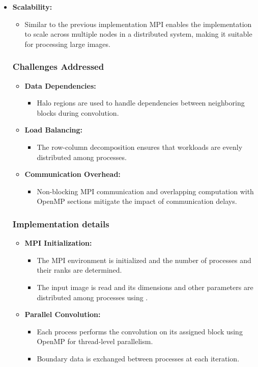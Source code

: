 \documentclass[conference, 10pt]{IEEEtran}
\begin{document}
\begin{itemize}
\begin{itemize}
    \item \textbf{Scalability:} 
    \begin{itemize}
    \item Similar to the previous implementation MPI enables the implementation to scale across multiple nodes in a distributed system, making it suitable for processing large images.
    \end{itemize}


\subsubsection{Challenges Addressed}
\begin{itemize}
 \item   \textbf{Data Dependencies:}
        \begin{itemize}
        \item Halo regions are used to handle dependencies between neighboring blocks during convolution.
        \end{itemize}

\item \textbf{Load Balancing:}
        \begin{itemize}
        \item The row-column decomposition ensures that workloads are evenly distributed among processes.
        \end{itemize}
\item \textbf{Communication Overhead:}
        \begin{itemize}
        \item Non-blocking MPI communication and overlapping computation with OpenMP sections mitigate the impact of communication delays.
        \end{itemize}

\end{itemize}

\subsubsection{Implementation details}

\begin{itemize}
    \item \textbf{MPI Initialization:} 
    \begin{itemize}
        \item The MPI environment is initialized and the number of processes and their ranks are determined.
        \item The input image is read and its dimensions and other parameters are distributed among processes using .
    \end{itemize}
    \item \textbf{Parallel Convolution:}
    \begin{itemize}
        \item Each process performs the convolution on its assigned block using OpenMP for thread-level parallelism.
        \item Boundary data is exchanged between processes at each iteration.
    \end{itemize}


\end{itemize}
\end{itemize}
\end{itemize}
\end{document}
